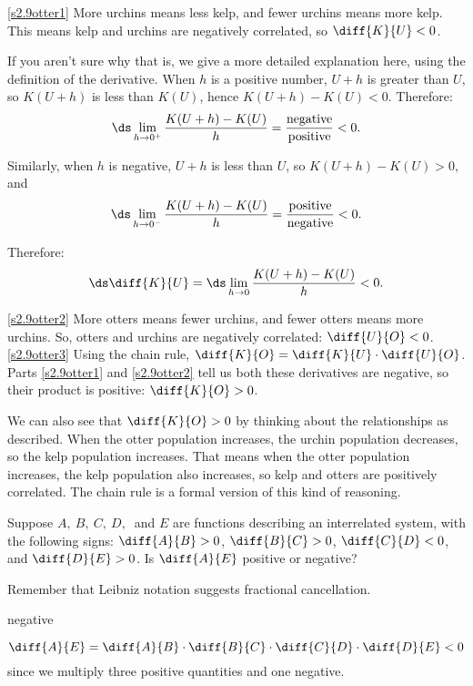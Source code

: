 \begin{solution}
\eqref{s2.9otter1}
More urchins means less kelp, and fewer urchins means more kelp. This means kelp and urchins are negatively correlated, so $\diff{K}{U}<0$.

If you aren't sure why that is, we give a more detailed explanation here, using the definition of the derivative.
When $h$ is a positive number, $U+h$ is greater than $U$, so $K(U+h)$ is less than $K(U)$, hence $K(U+h)-K(U)<0$.
 Therefore:
\[\ds\lim_{h \rightarrow 0^+}\dfrac{K(U+h)-K(U)}{h} = \dfrac{\mbox{negative}}{\mbox{positive}}<0.\]

Similarly, when $h$ is negative, $U+h$ is less than $U$, so $K(U+h)-K(U)>0$, and
\[\ds\lim_{h \rightarrow 0^-}\dfrac{K(U+h)-K(U)}{h}= \dfrac{\mbox{positive}}{\mbox{negative}}<0.\]

Therefore:
\[\ds\diff{K}{U}=\ds\lim_{h \rightarrow 0}\dfrac{K(U+h)-K(U)}{h}<0.\]

\eqref{s2.9otter2} More otters means fewer urchins, and fewer otters means more urchins. So, otters and urchins are negatively correlated: $\diff{U}{O}<0$.\\

\eqref{s2.9otter3} Using the chain rule, $\diff{K}{O} = \diff{K}{U}\cdot\diff{U}{O}$. Parts \eqref{s2.9otter1} and \eqref{s2.9otter2} tell us both these derivatives are negative, so their product is positive: $\diff{K}{O}>0$.

We can also see that $\diff{K}{O}>0$ by thinking about the relationships as described. When the otter population increases, the urchin population decreases, so the kelp population increases. That means when the otter population increases, the kelp population also increases, so kelp and otters are positively correlated. The chain rule is a formal version of this kind of reasoning.
\end{solution}




\begin{question}
Suppose $A,~B,~C,~D,~$ and $E$ are functions describing an interrelated system, with the following signs: $\diff{A}{B}>0$, $\diff{B}{C}>0$, $\diff{C}{D}<0$, and $\diff{D}{E}>0$. Is $\diff{A}{E}$ positive or negative?
\end{question}
\begin{hint}
Remember that Leibniz notation suggests fractional cancellation.
\end{hint}
\begin{answer}
negative
\end{answer}
\begin{solution}
\[\diff{A}{E}=\diff{A}{B}\cdot\diff{B}{C}\cdot\diff{C}{D}\cdot\diff{D}{E}<0\]
since we multiply three positive quantities and one negative.
\end{solution}

